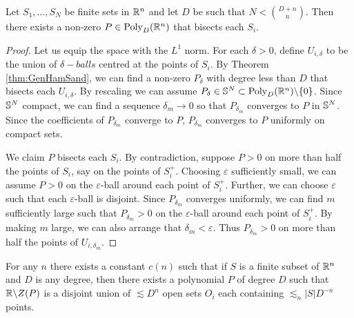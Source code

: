\begin{corollary}
    Let $S_1, \dots , S_N$ be finite sets in $\mathbb R^n$ and let $D$ be such that $N < {{D+n}\choose{n}}$. 
    Then there exists a non-zero $P\in \text{Poly}_D (\mathbb R^n)$ that bisects each $S_i$.  \label{thm:FiniteHamSandwich} 
\end{corollary}

\begin{proof}
    Let us equip the space with the $L^1$ norm.
    For each $\delta>0$, define $U_{i, \delta}$ to be the union of $\delta-balls$ centred at the points of $S_i$. 
    By Theorem \ref{thm:GenHamSand}, we can find a non-zero $P_{\delta}$ with degree less than $D$ that bisects each $U_{i, \delta}$. 
    By rescaling we can assume $P_{\delta} \in \mathbb S^N \subset \text{Poly}_D (\mathbb R^n) \backslash \{0\}$.
    Since $\mathbb S^N$ compact, we can find a sequence $\delta_m \to 0$ so that $P_{\delta_{m}}$ converges to $P$ in $\mathbb S^N$.
    Since the coefficients of $P_{\delta_{m}}$ converge to $P$, $P_{\delta_{m}}$ converges to $P$ uniformly on compact sets.

    We claim $P$ bisects each $S_i$. 
    By contradiction, suppose $P>0$ on more than half the points of $S_i$, say on the points of $S_i^+$. 
    Choosing $\varepsilon$ sufficiently small, we can assume $P>0$ on the $\varepsilon$-ball around each point of $S_i^+$.
    Further, we can choose $\varepsilon$ such that each $\varepsilon$-ball is disjoint. 
    Since $P_{\delta_{m}}$ converges uniformly, we can find $m$ sufficiently large such that $P_{\delta_{m}}>0$ 
    on the $\varepsilon$-ball around each point of $S_i^+$.
    By making $m$ large, we can also arrange that $\delta_m < \varepsilon$.
    Thus $P_{\delta_{m}} > 0$ on more than half the points of $U_{i, \delta_{m}}$.
\end{proof}

\begin{theorem}
    For any $n$ there exists a constant $c(n)$ such that if $S$ is a finite subset of $\mathbb R^n$ and $D$ is any degree, then there exists
    a polynomial $P$ of degree $D$ such that $\mathbb R \backslash Z(P)$ is a disjoint union of $\lesssim D^n$ open sets $O_i$ each containing
    $\lesssim_n |S|D^{-n}$ points. \label{thm:PolyPartioning}
 \end{theorem}
 
